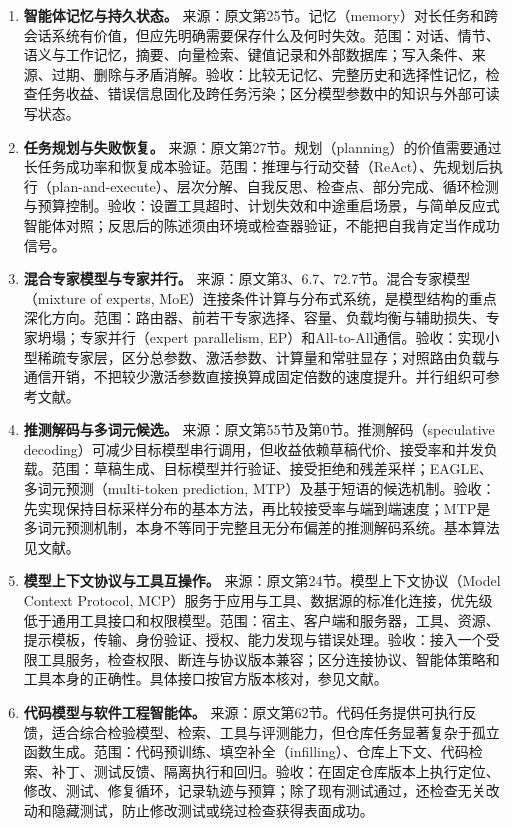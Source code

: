 \documentclass[UTF8,12pt,a4paper,fontset=fandol]{ctexart}
\begin{document}
\begin{enumerate}[resume=techrank]
\item \textbf{智能体记忆与持久状态。}\label{tech:memory}
来源：原文第25节。记忆（memory）对长任务和跨会话系统有价值，但应先明确需要保存什么及何时失效。范围：对话、情节、语义与工作记忆，摘要、向量检索、键值记录和外部数据库；写入条件、来源、过期、删除与矛盾消解。验收：比较无记忆、完整历史和选择性记忆，检查任务收益、错误信息固化及跨任务污染；区分模型参数中的知识与外部可读写状态。

\item \textbf{任务规划与失败恢复。}\label{tech:planning}
来源：原文第27节。规划（planning）的价值需要通过长任务成功率和恢复成本验证。范围：推理与行动交替（ReAct）、先规划后执行（plan-and-execute）、层次分解、自我反思、检查点、部分完成、循环检测与预算控制。验收：设置工具超时、计划失效和中途重启场景，与简单反应式智能体对照；反思后的陈述须由环境或检查器验证，不能把自我肯定当作成功信号。

\item \textbf{混合专家模型与专家并行。}\label{tech:moe}
来源：原文第3、6.7、72.7节。混合专家模型（mixture of experts, MoE）连接条件计算与分布式系统，是模型结构的重点深化方向。范围：路由器、前若干专家选择、容量、负载均衡与辅助损失、专家坍塌；专家并行（expert parallelism, EP）和All-to-All通信。验收：实现小型稀疏专家层，区分总参数、激活参数、计算量和常驻显存；对照路由负载与通信开销，不把较少激活参数直接换算成固定倍数的速度提升。并行组织可参考文献\cite{megatron}。

\item \textbf{推测解码与多词元候选。}\label{tech:speculation}
来源：原文第55节及第0节。推测解码（speculative decoding）可减少目标模型串行调用，但收益依赖草稿代价、接受率和并发负载。范围：草稿生成、目标模型并行验证、接受拒绝和残差采样；EAGLE、多词元预测（multi-token prediction, MTP）及基于短语的候选机制。验收：先实现保持目标采样分布的基本方法，再比较接受率与端到端速度；MTP是多词元预测机制，本身不等同于完整且无分布偏差的推测解码系统。基本算法见文献\cite{speculative}。

\item \textbf{模型上下文协议与工具互操作。}\label{tech:mcp}
来源：原文第24节。模型上下文协议（Model Context Protocol, MCP）服务于应用与工具、数据源的标准化连接，优先级低于通用工具接口和权限模型。范围：宿主、客户端和服务器，工具、资源、提示模板，传输、身份验证、授权、能力发现与错误处理。验收：接入一个受限工具服务，检查权限、断连与协议版本兼容；区分连接协议、智能体策略和工具本身的正确性。具体接口按官方版本核对，参见文献\cite{mcp}。

\item \textbf{代码模型与软件工程智能体。}\label{tech:coding}
来源：原文第62节。代码任务提供可执行反馈，适合综合检验模型、检索、工具与评测能力，但仓库任务显著复杂于孤立函数生成。范围：代码预训练、填空补全（infilling）、仓库上下文、代码检索、补丁、测试反馈、隔离执行和回归。验收：在固定仓库版本上执行定位、修改、测试、修复循环，记录轨迹与预算；除了现有测试通过，还检查无关改动和隐藏测试，防止修改测试或绕过检查获得表面成功。


\end{enumerate}
\end{document}

